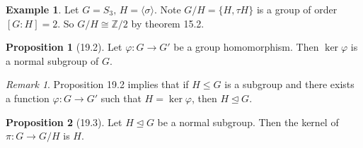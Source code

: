 \documentclass{article}
\newcommand{\Z}{\mathbb{Z}}
\newcommand{\func}[3]{#1: #2 \to #3}
\theoremstyle{definition}
\newtheorem*{prop}{Proposition}
\newtheorem*{ex}{Example}
\theoremstyle{remark}
\newtheorem*{rmk}{Remark}
\newcommand{\cyc}[1]{\langle#1\rangle}
\newcommand{\normal}{\unlhd}
\begin{document}
{{            \begin{ex}
                Let $G=S_3, \, H=\cyc{\sigma}$. Note $G/H=\{H,\tau H\}$ is a group of order $[G:H]=2$. So $G/H\cong \Z/2$ by theorem 15.2.
            \end{ex}
                
            \begin{prop}[19.2]
                Let $\func{\varphi}{G}{G'}$ be a group homomorphism. Then $\ker\varphi$ is a normal subgroup of $G$.
            \end{prop}
                
            \begin{rmk}
                Proposition 19.2 implies that if $H\leq G$ is a subgroup and there exists a function $\func{\varphi}{G}{G'}$ such that $H=\ker \varphi$, then $H\normal G$.   
            \end{rmk}
            
            \begin{prop}[19.3]
                Let $H\normal G$ be a normal subgroup. Then the kernel of $\func{\pi}{G}{G/H}$ is $H$.
            \end{prop}
        }
    }
\end{document}
